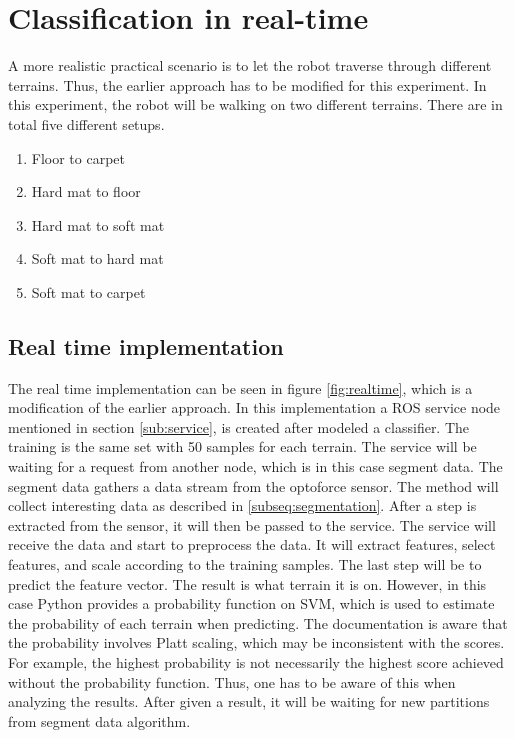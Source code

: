 \documentclass[USenglish]{ifimaster}  %
\begin{document}
\section{Classification in real-time} \label{sec:realtime}
A more realistic practical scenario is to let the robot traverse through different terrains. Thus, the earlier approach has to be modified for this experiment. In this experiment, the robot will be walking on two different terrains. There are in total five different setups.
	
	
	\begin{enumerate}
		\item Floor to carpet
		\item Hard mat to floor
		\item Hard mat to soft mat
		\item Soft mat to hard mat
		\item Soft mat to carpet
	\end{enumerate}
	
\subsection{Real time implementation} %
The real time implementation can be seen in figure \ref{fig:realtime}, which is a modification of the earlier approach. In this implementation a ROS service node mentioned in section \ref{sub:service}, is created after modeled a classifier. The training is the same set with 50 samples for each terrain. The service will be waiting for a request from another node, which is in this case segment data. The segment data gathers a data stream from the optoforce sensor. The method will collect interesting data as described in \ref{subseq:segmentation}. After a step is extracted from the sensor, it will then be passed to the service. The service will receive the data and start to preprocess the data. It will extract features, select features, and scale according to the training samples. The last step will be to predict the feature vector. The result is what terrain it is on. However, in this case Python provides a probability function on SVM, which is used to estimate the probability of each terrain when predicting. The documentation is aware that the probability involves Platt scaling, which may be inconsistent with the scores. For example, the highest probability is not necessarily the highest score achieved without the probability function. Thus, one has to be aware of this when analyzing the results. After given a result, it will be waiting for new partitions from segment data algorithm.
	
\end{document}
